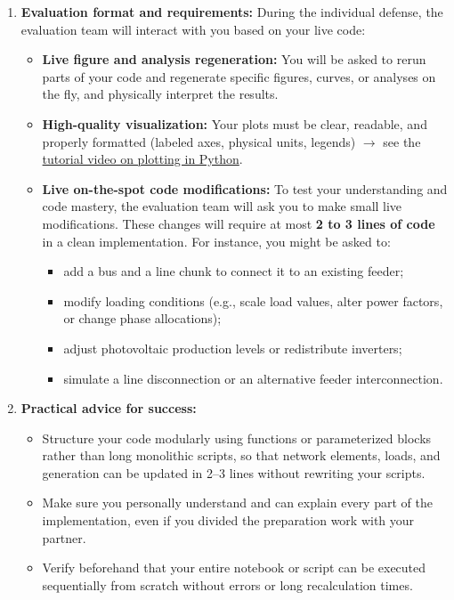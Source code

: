 \documentclass[a4paper]{article}
\begin{document}
\begin{enumerate}
    \item \textbf{Evaluation format and requirements:} During the individual defense, the evaluation team will interact with you based on your live code:
    \begin{itemize}
        \item \textbf{Live figure and analysis regeneration:} You will be asked to rerun parts of your code and regenerate specific figures, curves, or analyses on the fly, and physically interpret the results.
        \item \textbf{High-quality visualization:} Your plots must be clear, readable, and properly formatted (labeled axes, physical units, legends) $\rightarrow$ see the \href{https://www.youtube.com/watch?v=rUV8VFbUi_U}{tutorial video on plotting in Python}.
        \item \textbf{Live on-the-spot code modifications:} To test your understanding and code mastery, the evaluation team will ask you to make small live modifications. These changes will require at most \textbf{2 to 3 lines of code} in a clean implementation. For instance, you might be asked to:
        \begin{itemize}
            \item add a bus and a line chunk to connect it to an existing feeder;
            \item modify loading conditions (e.g., scale load values, alter power factors, or change phase allocations);
            \item adjust photovoltaic production levels or redistribute inverters;
            \item simulate a line disconnection or an alternative feeder interconnection.
        \end{itemize}
    \end{itemize}
    
    \item \textbf{Practical advice for success:}
    \begin{itemize}
        \item Structure your code modularly using functions or parameterized blocks rather than long monolithic scripts, so that network elements, loads, and generation can be updated in 2--3 lines without rewriting your scripts.
        \item Make sure you personally understand and can explain every part of the implementation, even if you divided the preparation work with your partner.
        \item Verify beforehand that your entire notebook or script can be executed sequentially from scratch without errors or long recalculation times.
    \end{itemize}
\end{enumerate}
\end{document}

